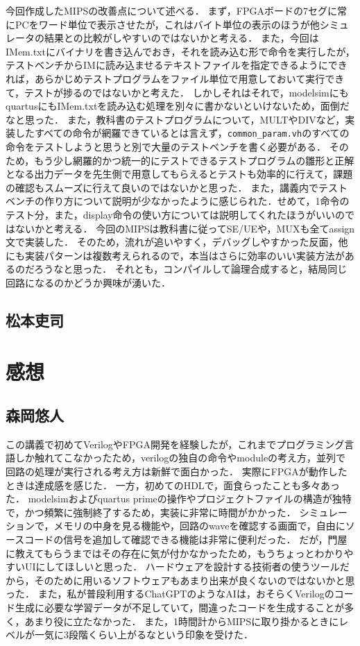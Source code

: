 \documentclass[dvipdfmx]{jsarticle}
\begin{document}
今回作成したMIPSの改善点について述べる．
まず，FPGAボードの7セグに常にPCをワード単位で表示させたが，これはバイト単位の表示のほうが他シミュレータの結果との比較がしやすいのではないかと考える．
また，今回はIMem.txtにバイナリを書き込んでおき，それを読み込む形で命令を実行したが，テストベンチからIMに読み込ませるテキストファイルを指定できるようにできれば，あらかじめテストプログラムをファイル単位で用意しておいて実行できて，テストが捗るのではないかと考えた．
しかしそれはそれで，modelsimにもquartusにもIMem.txtを読み込む処理を別々に書かないといけないため，面倒だなと思った．
また，教科書のテストプログラムについて，MULTやDIVなど，実装したすべての命令が網羅できているとは言えず，\texttt{common_param.vh}のすべての命令をテストしようと思うと別で大量のテストベンチを書く必要がある．
そのため，もう少し網羅的かつ統一的にテストできるテストプログラムの雛形と正解となる出力データを先生側で用意してもらえるとテストも効率的に行えて，課題の確認もスムーズに行えて良いのではないかと思った．
また，講義内でテストベンチの作り方について説明が少なかったように感じられた．せめて，1命令のテスト分，また，display命令の使い方については説明してくれたほうがいいのではないかと考える．
今回のMIPSは教科書に従ってSE/UEや，MUXも全てassign文で実装した．
そのため，流れが追いやすく，デバッグしやすかった反面，他にも実装パターンは複数考えられるので，本当はさらに効率のいい実装方法があるのだろうなと思った．
それとも，コンパイルして論理合成すると，結局同じ回路になるのかどうか興味が湧いた．

\subsection{松本吏司}



\section{感想}
\subsection{森岡悠人}
この講義で初めてVerilogやFPGA開発を経験したが，これまでプログラミング言語しか触れてこなかったため，verilogの独自の命令やmoduleの考え方，並列で回路の処理が実行される考え方は新鮮で面白かった．
実際にFPGAが動作したときは達成感を感じた．
一方，初めてのHDLで，面食らったことも多々あった．
modelsimおよびquartus primeの操作やプロジェクトファイルの構造が独特で，かつ頻繁に強制終了するため，実装に非常に時間がかかった．
シミュレーションで，メモリの中身を見る機能や，回路のwaveを確認する画面で，自由にソースコードの信号を追加して確認できる機能は非常に便利だった．
だが，門屋に教えてもらうまではその存在に気が付かなかったため，もうちょっとわかりやすいUIにしてほしいと思った．
ハードウェアを設計する技術者の使うツールだから，そのために用いるソフトウェアもあまり出来が良くないのではないかと思った．
また，私が普段利用するChatGPTのようなAIは，おそらくVerilogのコード生成に必要な学習データが不足していて，間違ったコードを生成することが多く，あまり役に立たなかった．
また，1時間計からMIPSに取り掛かるときにレベルが一気に3段階くらい上がるなという印象を受けた．
\end{document}
